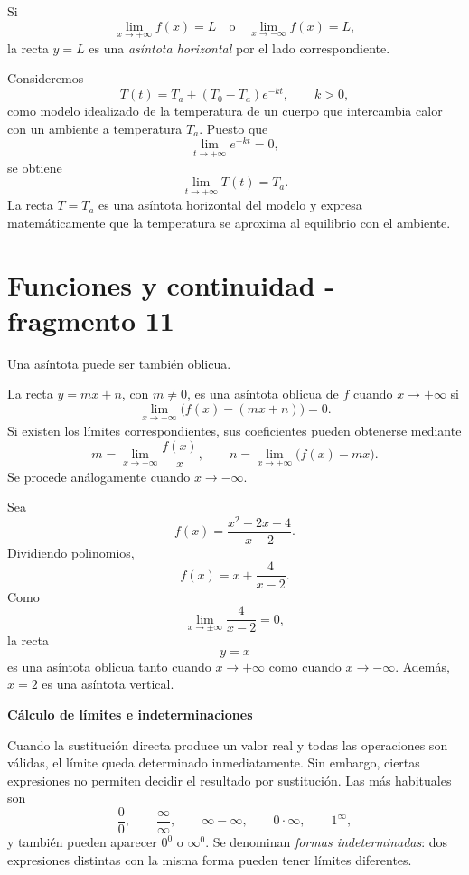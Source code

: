 Si
\[
\lim_{x\to+\infty}f(x)=L
\quad\text{o}\quad
\lim_{x\to-\infty}f(x)=L,
\]
la recta $y=L$ es una \emph{asíntota horizontal} por el lado correspondiente.

\begin{example}
Consideremos
\[
T(t)=T_a+(T_0-T_a)e^{-kt},\qquad k>0,
\]
como modelo idealizado de la temperatura de un cuerpo que intercambia calor con un ambiente a temperatura $T_a$. Puesto que
\[
\lim_{t\to+\infty}e^{-kt}=0,
\]
se obtiene
\[
\lim_{t\to+\infty}T(t)=T_a.
\]
La recta $T=T_a$ es una asíntota horizontal del modelo y expresa matemáticamente que la temperatura se aproxima al equilibrio con el ambiente.
\end{example}


\section{Funciones y continuidad - fragmento 11}
Una asíntota puede ser también oblicua.

\begin{definition}
La recta $y=mx+n$, con $m\neq0$, es una asíntota oblicua de $f$ cuando $x\to+\infty$ si
\[
\lim_{x\to+\infty}\bigl(f(x)-(mx+n)\bigr)=0.
\]
Si existen los límites correspondientes, sus coeficientes pueden obtenerse mediante
\[
m=\lim_{x\to+\infty}\frac{f(x)}x,
\qquad
n=\lim_{x\to+\infty}\bigl(f(x)-mx\bigr).
\]
Se procede análogamente cuando $x\to-\infty$.
\end{definition}

\begin{example}
Sea
\[
f(x)=\frac{x^2-2x+4}{x-2}.
\]
Dividiendo polinomios,
\[
f(x)=x+\frac{4}{x-2}.
\]
Como
\[
\lim_{x\to\pm\infty}\frac{4}{x-2}=0,
\]
la recta
\[
y=x
\]
es una asíntota oblicua tanto cuando $x\to+\infty$ como cuando $x\to-\infty$. Además, $x=2$ es una asíntota vertical.
\end{example}

\textbf{Cálculo de límites e indeterminaciones}

Cuando la sustitución directa produce un valor real y todas las operaciones son válidas, el límite queda determinado inmediatamente. Sin embargo, ciertas expresiones no permiten decidir el resultado por sustitución. Las más habituales son
\[
\frac00,\qquad \frac{\infty}{\infty},\qquad
\infty-\infty,\qquad 0\cdot\infty,
\qquad 1^\infty,
\]
y también pueden aparecer $0^0$ o $\infty^0$. Se denominan \emph{formas indeterminadas}: dos expresiones distintas con la misma forma pueden tener límites diferentes.

